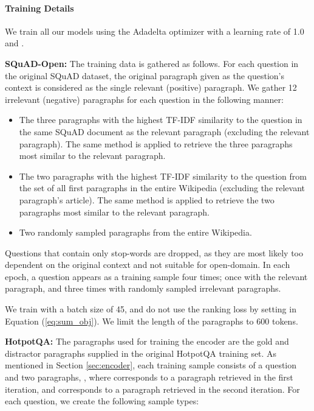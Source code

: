 \documentclass[11pt,a4paper,dvipsnames]{article}
\begin{document}
\paragraph{Training Details}
We train all our models using the Adadelta optimizer \citep{adadelta} with a learning rate of 1.0 and . \par
\textbf{SQuAD-Open:} The training data is gathered as follows.
For each question in the original SQuAD dataset, the original paragraph given as the question's context is considered as the single relevant (positive) paragraph. We gather 12 irrelevant (negative) paragraphs for each question in the following manner:
\begin{itemize}
    \item The three paragraphs with the highest TF-IDF similarity to the question in the same SQuAD document as the relevant paragraph (excluding the relevant paragraph). The same method is applied to retrieve the three paragraphs most similar to the relevant paragraph.
    \item The two paragraphs with the highest TF-IDF similarity to the question from the set of all first paragraphs in the entire Wikipedia (excluding the relevant paragraph's article). The same method is applied to retrieve the two paragraphs most similar to the relevant paragraph.
    \item Two randomly sampled paragraphs from the entire Wikipedia.
\end{itemize}
Questions that contain only stop-words are dropped, as they are most likely too dependent on the original context and not suitable for open-domain.
In each epoch, a question appears as a training sample four times; once with the relevant paragraph, and three times with randomly sampled irrelevant paragraphs. \par
We train with a batch size of 45, and do not use the ranking loss by setting  in Equation (\ref{eq:sum_obj}). We limit the length of the paragraphs to 600 tokens. \par
\textbf{HotpotQA:} The paragraphs used for training the encoder are the gold and distractor paragraphs supplied in the original HotpotQA training set. As mentioned in Section \ref{sec:encoder}, each training sample consists of a question and two paragraphs, , where  corresponds to a paragraph retrieved in the first iteration, and  corresponds to a paragraph retrieved in the second iteration. For each question, we create the following sample types:
\end{document}
